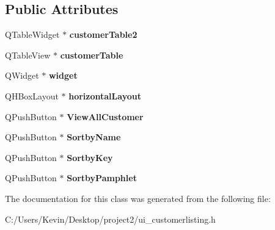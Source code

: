 \subsection*{Public Attributes}
\begin{DoxyCompactItemize}
\item 
\mbox{\label{class_ui__customer_listing_a3099c0d6cb377cea7162dcb83dc9b367}} 
Q\+Table\+Widget $\ast$ {\bfseries customer\+Table2}
\item 
\mbox{\label{class_ui__customer_listing_a7f1118df4279405418bc8315b723c5a8}} 
Q\+Table\+View $\ast$ {\bfseries customer\+Table}
\item 
\mbox{\label{class_ui__customer_listing_a2e0b51ea96979e2703d76a46d0c31d89}} 
Q\+Widget $\ast$ {\bfseries widget}
\item 
\mbox{\label{class_ui__customer_listing_acbf129d332991405257dddef2ff95b60}} 
Q\+H\+Box\+Layout $\ast$ {\bfseries horizontal\+Layout}
\item 
\mbox{\label{class_ui__customer_listing_a4b1909055e76fd455b5ce7036dd9293d}} 
Q\+Push\+Button $\ast$ {\bfseries View\+All\+Customer}
\item 
\mbox{\label{class_ui__customer_listing_a30baffe9fe7b34adceab714d7345a7b6}} 
Q\+Push\+Button $\ast$ {\bfseries Sortby\+Name}
\item 
\mbox{\label{class_ui__customer_listing_aacd8bf39448730821f9a7fc2ba383424}} 
Q\+Push\+Button $\ast$ {\bfseries Sortby\+Key}
\item 
\mbox{\label{class_ui__customer_listing_a5a05b551507a3c922e6364f0a89ba87f}} 
Q\+Push\+Button $\ast$ {\bfseries Sortby\+Pamphlet}
\end{DoxyCompactItemize}


The documentation for this class was generated from the following file\+:\begin{DoxyCompactItemize}
\item 
C\+:/\+Users/\+Kevin/\+Desktop/project2/ui\+\_\+customerlisting.\+h\end{DoxyCompactItemize}
